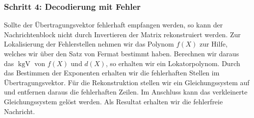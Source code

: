 \subsubsection{Schritt 4: Decodierung mit Fehler}
Sollte der Übertragungsvektor fehlerhaft empfangen werden, so kann der Nachrichtenblock nicht durch Invertieren der Matrix rekonstruiert werden.
Zur Lokalisierung der Fehlerstellen nehmen wir das Polynom $f(X)$ zur Hilfe, welches wir über den Satz von Fermat bestimmt haben.
Berechnen wir daraus das $\operatorname{kgV}$ von $f(X)$ und $d(X)$, so erhalten wir ein Lokatorpolynom.
Durch das Bestimmen der Exponenten erhalten wir die fehlerhaften Stellen im Übertragungsvektor.
Für die Rekonstruktion stellen wir ein Gleichungssystem auf und entfernen daraus die fehlerhaften Zeilen.
Im Anschluss kann das verkleinerte Gleichungssystem gelöst werden. 
Als Resultat erhalten wir die fehlerfreie Nachricht.
